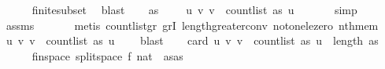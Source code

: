 \begin{isabellebody}
\ \ \ \ \isamarkupfalse%
\ finite{\isacharunderscore}{\kern0pt}subset\ \isamarkupfalse%
\ blast\isanewline
\isanewline
\ \ \isamarkupfalse%
\ {\isachardoublequoteopen}{\isacharparenleft}{\kern0pt}as\ {\isacharbang}{\kern0pt}\ {}{\isacharcomma}{\kern0pt}\ {}{\isacharparenright}{\kern0pt}\ {\isasymin}\ {\isacharbraceleft}{\kern0pt}{\isacharparenleft}{\kern0pt}u{\isacharcomma}{\kern0pt}\ v{\isacharparenright}{\kern0pt}{\isachardot}{\kern0pt}\ v\ {\isacharless}{\kern0pt}\ count{\isacharunderscore}{\kern0pt}list\ as\ u{\isacharbraceright}{\kern0pt}{\isachardoublequoteclose}\ \isanewline
\ \ \ \ \isamarkupfalse%
\ {\isacharparenleft}{\kern0pt}simp{\isacharparenright}{\kern0pt}\isanewline
\ \ \ \ \isamarkupfalse%
\ assms{\isacharparenleft}{\kern0pt}{}{\isacharparenright}{\kern0pt}\ \isanewline
\ \ \ \ \isamarkupfalse%
\ {\isacharparenleft}{\kern0pt}metis\ count{\isacharunderscore}{\kern0pt}list{\isacharunderscore}{\kern0pt}gr{\isacharunderscore}{\kern0pt}{}\ gr{}I\ length{\isacharunderscore}{\kern0pt}greater{\isacharunderscore}{\kern0pt}{}{\isacharunderscore}{\kern0pt}conv\ not{\isacharunderscore}{\kern0pt}one{\isacharunderscore}{\kern0pt}le{\isacharunderscore}{\kern0pt}zero\ nth{\isacharunderscore}{\kern0pt}mem{\isacharparenright}{\kern0pt}\isanewline
\ \ \isamarkupfalse%
\ {\isachardoublequoteopen}{\isacharbraceleft}{\kern0pt}{\isacharparenleft}{\kern0pt}u{\isacharcomma}{\kern0pt}\ v{\isacharparenright}{\kern0pt}{\isachardot}{\kern0pt}\ v\ {\isacharless}{\kern0pt}\ count{\isacharunderscore}{\kern0pt}list\ as\ u{\isacharbraceright}{\kern0pt}\ {\isasymnoteq}\ {\isacharbraceleft}{\kern0pt}{\isacharbraceright}{\kern0pt}{\isachardoublequoteclose}\ \isamarkupfalse%
\ blast\isanewline
\isanewline
\ \ \isamarkupfalse%
\ {\isachardoublequoteopen}card\ {\isacharbraceleft}{\kern0pt}{\isacharparenleft}{\kern0pt}u{\isacharcomma}{\kern0pt}\ v{\isacharparenright}{\kern0pt}{\isachardot}{\kern0pt}\ v\ {\isacharless}{\kern0pt}\ count{\isacharunderscore}{\kern0pt}list\ as\ u{\isacharbraceright}{\kern0pt}\ {\isacharequal}{\kern0pt}\ length\ as{\isachardoublequoteclose}\isanewline
\ \ \ \ \isamarkupfalse%
\ fin{\isacharunderscore}{\kern0pt}space\ split{\isacharunderscore}{\kern0pt}space{\isacharbrackleft}{\kern0pt}\ f{\isacharequal}{\kern0pt}{\isachardoublequoteopen}{\isasymlambda}{\isacharunderscore}{\kern0pt}{\isachardot}{\kern0pt}\ {\isacharparenleft}{\kern0pt}{}{\isacharcolon}{\kern0pt}{\isacharcolon}{\kern0pt}nat{\isacharparenright}{\kern0pt}{\isachardoublequoteclose}{\isacharcomma}{\kern0pt}\ \ as{\isacharequal}{\kern0pt}{\isachardoublequoteopen}as{\isachardoublequoteclose}{\isacharbrackright}{\kern0pt}\isanewline

\end{isabellebody}
